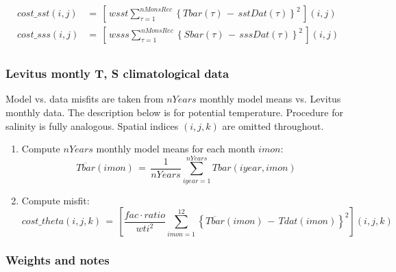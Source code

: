 \begin{equation}
\begin{split}
cost\_sst(i,j) & = \,
\left[ \, wsst \sum_{\tau=1}^{nMonsRec}
\left\{ Tbar(\tau) \, - \, sstDat(\tau) \right\}^2 \, \right](i,j)
 \\
cost\_sss(i,j) & = \,
\left[ \, wsss \sum_{\tau=1}^{nMonsRec}
\left\{ Sbar(\tau) \, - \, sssDat(\tau) \right\}^2 \, \right](i,j)
 \\
\end{split}
\end{equation}

\subsubsection{Levitus montly T, S climatological data}

Model vs. data misfits are taken from $nYears$ monthly model means
vs. Levitus monthly data.
The description below is for potential temperature.
Procedure for salinity is fully analogous.
Spatial indices $(i,j,k)$ are omitted throughout.
%
\begin{enumerate}
%
\item
Compute $nYears$ monthly model means for each month $imon$:
\[
\overline{Tbar}(imon) \, = \, \frac{1}{nYears} 
\sum_{iyear=1}^{nYears} Tbar(iyear,imon)
\]
%
\item
Compute misfit:
\[
cost\_theta(i,j,k) \, = \, \left[ 
\frac{fac \cdot ratio}{wti^2} \sum_{imon=1}^{12}
\left\{ \overline{Tbar}(imon) \, - \, Tdat(imon) \right\}^2  \right] (i,j,k)
\]

\end{enumerate}


\subsubsection{Weights and notes}

